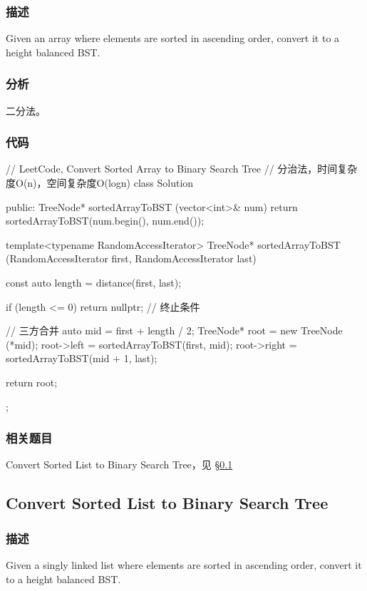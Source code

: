 \subsubsection{描述}
Given an array where elements are sorted in ascending order, convert it to a height balanced BST.


\subsubsection{分析}
二分法。


\subsubsection{代码}

\begin{Code}
// LeetCode, Convert Sorted Array to Binary Search Tree
// 分治法，时间复杂度O(n)，空间复杂度O(logn)
class Solution {
public:
    TreeNode* sortedArrayToBST (vector<int>& num) {
        return sortedArrayToBST(num.begin(), num.end());
    }

    template<typename RandomAccessIterator>
    TreeNode* sortedArrayToBST (RandomAccessIterator first,
            RandomAccessIterator last) {
        const auto length = distance(first, last);

        if (length <= 0) return nullptr;  // 终止条件

        // 三方合并
        auto mid = first + length / 2;
        TreeNode* root = new TreeNode (*mid);
        root->left = sortedArrayToBST(first, mid);
        root->right = sortedArrayToBST(mid + 1, last);

        return root;
    }
};
\end{Code}


\subsubsection{相关题目}
\begindot
\item Convert Sorted List to Binary Search Tree，见 \S \ref{sec:convert-sorted-list-to-binary-search-tree}
\myenddot


\subsection{Convert Sorted List to Binary Search Tree}
\label{sec:convert-sorted-list-to-binary-search-tree}


\subsubsection{描述}
Given a singly linked list where elements are sorted in ascending order, convert it to a height balanced BST.


